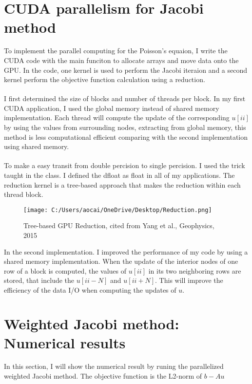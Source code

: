 \documentclass[12pt]{article}
\begin{document}
\section{CUDA parallelism for Jacobi method}
To implement the parallel computing for the Poisson's equaion, I write the CUDA code with the main funciton to allocate arrays and move data onto the GPU. In the code, one kernel is used to perform the Jacobi iteraion and a second kernel perform the objective function calculation using a reduction.\\\\
I first determined the size of blocks and number of threads per block. In my first CUDA application, I used the global memory instead of shared memory implementation. Each thread will compute the update of the corresponding $u[ii]$ by using the values from surrounding nodes, extracting from global memory, this method is less computational efficient comparing with the second implementation using shared memory.\\\\
To make a easy transit from double percision to single percision. I used the trick taught in the class. I defined the dfloat as float in all of my applications. The reduction kernel is a tree-based approach that makes the reduction within each thread block.
\begin{figure}[H]
	\centering
	\texttt{[image: C:/Users/aocai/OneDrive/Desktop/Reduction.png]}
	\caption[Optional caption]{Tree-based GPU Reduction, cited from Yang et al., Geophysics, 2015}
	\label{fig:Reduction}
\end{figure}


In the second implementation. I improved the performance of my code by using a shared memory implementation. When the update of the interior nodes of one row of a block is computed, the values of $u[ii]$ in its two neighboring rows are stored, that include the $u[ii-N]$ and $u[ii+N]$. This will improve the efficiency of the data I/O when computing the updates of $u$.


 
\section{Weighted Jacobi method: Numerical results}
In this section, I will show the numerical result by runing the parallelized weighted Jacobi method. The objective function is the L2-norm of $b-Au$\\\\
\end{document}
